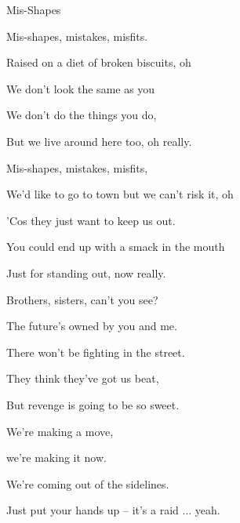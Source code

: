 \begin{song}{Mis-Shapes}{

    \chordset[Verse]{ \AMaj \EMaj \Fshm \DMaj \DSeven}

    \chordset[Chorus]{ \GMaj \GMajSeven \GSeven \CMaj \CMajSeven \CSeven }
	
	\chordset{ \Em \EmSix \EmaddC }

}

	 \begin{songverse}
		Mis-shapes, mistakes, misfits. 

		Raised on a diet of broken biscuits, oh 

		We don't look the same as you 
		
		We don't do the things you do,
		
		But we live around here too, oh really. 
	 \end{songverse}

	 \begin{songverse}
		Mis-shapes, mistakes, misfits,

		We'd like to go to town but we can't risk it, oh \ch{F\#m} 

		'Cos they just want to keep us out. \ch{D}
		
		You could end up with a smack in the mouth

		Just for standing out, now really.
	 \end{songverse}

	 \begin{songverse}

		Brothers, sisters, can't you see? 

		The future's owned by you and me. 

		There won't be fighting in the street. 

		They think they've got us beat, 

		But revenge is going to be so sweet. 
	\end{songverse}

	\begin{songchorus}
		
		 \quad We're making a move, 

		we're making it now. 

		We're coming out of the sidelines. 

		\quad Just put your hands up -- it's a raid ... yeah.


\end{songchorus}
\end{song}
